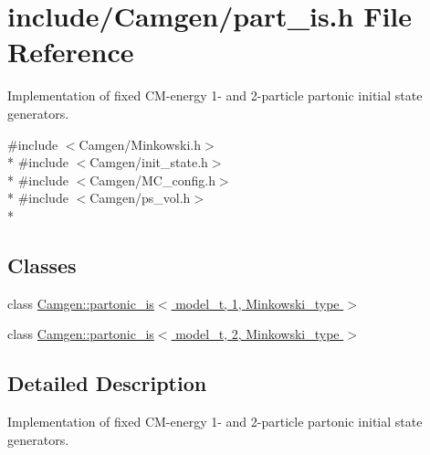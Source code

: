 \hypertarget{a00687}{\section{include/\-Camgen/part\-\_\-is.h File Reference}
\label{a00687}
}


Implementation of fixed C\-M-\/energy 1-\/ and 2-\/particle partonic initial state generators.  


{\ttfamily \#include $<$Camgen/\-Minkowski.\-h$>$}\\*
{\ttfamily \#include $<$Camgen/init\-\_\-state.\-h$>$}\\*
{\ttfamily \#include $<$Camgen/\-M\-C\-\_\-config.\-h$>$}\\*
{\ttfamily \#include $<$Camgen/ps\-\_\-vol.\-h$>$}\\*
\subsection*{Classes}
\begin{DoxyCompactItemize}
\item 
class \hyperlink{a00407}{Camgen\-::partonic\-\_\-is$<$ model\-\_\-t, 1, Minkowski\-\_\-type $>$}
\item 
class \hyperlink{a00408}{Camgen\-::partonic\-\_\-is$<$ model\-\_\-t, 2, Minkowski\-\_\-type $>$}
\end{DoxyCompactItemize}


\subsection{Detailed Description}
Implementation of fixed C\-M-\/energy 1-\/ and 2-\/particle partonic initial state generators. 